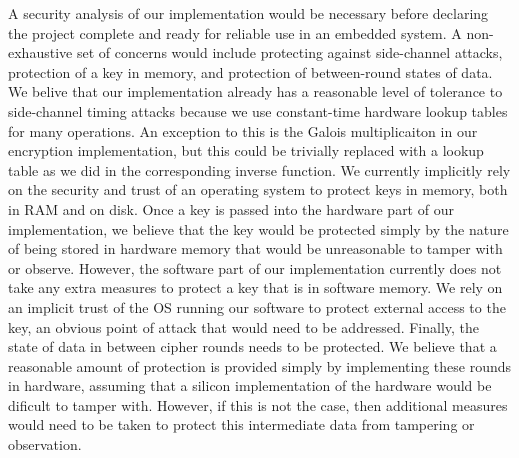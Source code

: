 A security analysis of our implementation would be necessary before declaring the project complete and ready for reliable use in an embedded system.  A non-exhaustive set of concerns would include protecting against side-channel attacks, protection of a key in memory, and protection of between-round states of data.  
We belive that our implementation already has a reasonable level of tolerance to side-channel timing attacks because we use constant-time hardware lookup tables for many operations.  An exception to this is the Galois multiplicaiton in our encryption implementation, but this could be trivially replaced with a lookup table as we did in the corresponding inverse function.
We currently implicitly rely on the security and trust of an operating system to protect keys in memory, both in RAM and on disk.  Once a key is passed into the hardware part of our implementation, we believe that the key would be protected simply by the nature of being stored in hardware memory that would be unreasonable to tamper with or observe.  However, the software part of our implementation currently does not take any extra measures to protect a key that is in software memory.  We rely on an implicit trust of the OS running our software to protect external access to the key, an obvious point of attack that would need to be addressed.
Finally, the state of data in between cipher rounds needs to be protected.  We believe that a reasonable amount of protection is provided simply by implementing these rounds in hardware, assuming that a silicon implementation of the hardware would be dificult to tamper with.  However, if this is not the case, then additional measures would need to be taken to protect this intermediate data from tampering or observation.
